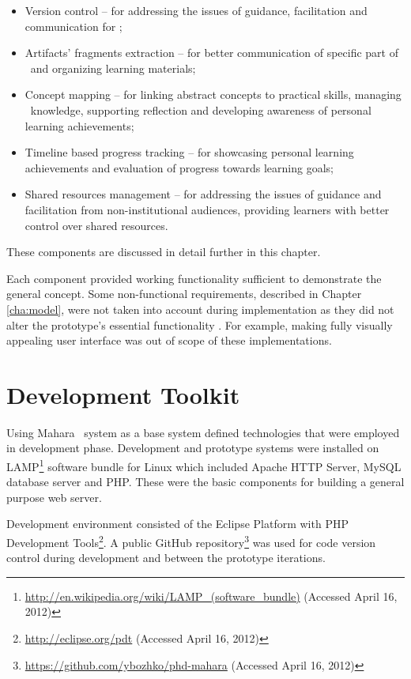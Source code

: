 \begin{itemize}
  \item Version control -- for addressing the issues of guidance, facilitation
  and communication for \LLLsn;
  \item Artifacts' fragments extraction -- for better communication of specific
  part of \ep~and organizing learning materials;
  \item Concept mapping -- for linking abstract concepts to practical skills,
  managing \ep~knowledge, supporting reflection and developing awareness of
  personal learning achievements;
  \item Timeline based progress tracking -- for showcasing personal learning
  achievements and evaluation of progress towards learning goals;
  \item Shared resources management -- for addressing the issues of guidance
  and facilitation from non-institutional audiences, providing learners with
  better control over shared resources.
\end{itemize}

These components are discussed in detail further in this chapter.

Each component provided working functionality sufficient to demonstrate the
general concept. Some non-functional requirements, described in Chapter
\ref{cha:model}, were not taken into account during implementation as they did
not alter the prototype's essential functionality \citep{Robertson2006}. For
example, making fully visually appealing user interface was out of scope of these
implementations.

\section{Development Toolkit}

Using Mahara \ep~system as a base system defined technologies that were employed
in development phase. Development and prototype systems were installed on
LAMP\footnote{\url{http://en.wikipedia.org/wiki/LAMP_(software_bundle)}
(Accessed April 16, 2012)} software bundle for Linux which included Apache HTTP Server, MySQL database
server and PHP. These were the basic components for building a general purpose
web server.

Development environment consisted of the
Eclipse Platform with PHP Development
Tools\footnote{\url{http://eclipse.org/pdt} (Accessed April 16, 2012)}. A public
GitHub repository\footnote{\url{https://github.com/ybozhko/phd-mahara} (Accessed
April 16, 2012)} was used for code version control during development and
between the prototype iterations.

